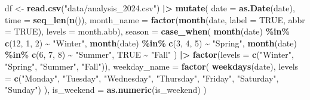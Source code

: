 \documentclass[
]{article}
\newenvironment{Shaded}{\begin{snugshade}}{\end{snugshade}}
\newcommand{\AttributeTok}[1]{\textcolor[rgb]{0.13,0.29,0.53}{#1}}
\newcommand{\ConstantTok}[1]{\textcolor[rgb]{0.56,0.35,0.01}{#1}}
\newcommand{\DecValTok}[1]{\textcolor[rgb]{0.00,0.00,0.81}{#1}}
\newcommand{\FunctionTok}[1]{\textcolor[rgb]{0.13,0.29,0.53}{\textbf{#1}}}
\newcommand{\NormalTok}[1]{#1}
\newcommand{\OtherTok}[1]{\textcolor[rgb]{0.56,0.35,0.01}{#1}}
\newcommand{\SpecialCharTok}[1]{\textcolor[rgb]{0.81,0.36,0.00}{\textbf{#1}}}
\newcommand{\StringTok}[1]{\textcolor[rgb]{0.31,0.60,0.02}{#1}}
\begin{document}
\begin{Shaded}
\begin{Highlighting}[]
\NormalTok{df }\OtherTok{\textless{}{-}} \FunctionTok{read.csv}\NormalTok{(}\StringTok{"data/analysis\_2024.csv"}\NormalTok{) }\SpecialCharTok{|\textgreater{}}
  \FunctionTok{mutate}\NormalTok{(}
    \AttributeTok{date =} \FunctionTok{as.Date}\NormalTok{(date),}
    \AttributeTok{time =} \FunctionTok{seq\_len}\NormalTok{(}\FunctionTok{n}\NormalTok{()),}
    \AttributeTok{month\_name =} \FunctionTok{factor}\NormalTok{(}\FunctionTok{month}\NormalTok{(date, }\AttributeTok{label =} \ConstantTok{TRUE}\NormalTok{, }\AttributeTok{abbr =} \ConstantTok{TRUE}\NormalTok{),}
                        \AttributeTok{levels =}\NormalTok{ month.abb),}
    \AttributeTok{season =} \FunctionTok{case\_when}\NormalTok{(}
      \FunctionTok{month}\NormalTok{(date) }\SpecialCharTok{\%in\%} \FunctionTok{c}\NormalTok{(}\DecValTok{12}\NormalTok{, }\DecValTok{1}\NormalTok{, }\DecValTok{2}\NormalTok{) }\SpecialCharTok{\textasciitilde{}} \StringTok{"Winter"}\NormalTok{,}
      \FunctionTok{month}\NormalTok{(date) }\SpecialCharTok{\%in\%} \FunctionTok{c}\NormalTok{(}\DecValTok{3}\NormalTok{, }\DecValTok{4}\NormalTok{, }\DecValTok{5}\NormalTok{)  }\SpecialCharTok{\textasciitilde{}} \StringTok{"Spring"}\NormalTok{,}
      \FunctionTok{month}\NormalTok{(date) }\SpecialCharTok{\%in\%} \FunctionTok{c}\NormalTok{(}\DecValTok{6}\NormalTok{, }\DecValTok{7}\NormalTok{, }\DecValTok{8}\NormalTok{)  }\SpecialCharTok{\textasciitilde{}} \StringTok{"Summer"}\NormalTok{,}
      \ConstantTok{TRUE}                         \SpecialCharTok{\textasciitilde{}} \StringTok{"Fall"}
\NormalTok{    ) }\SpecialCharTok{|\textgreater{}} \FunctionTok{factor}\NormalTok{(}\AttributeTok{levels =} \FunctionTok{c}\NormalTok{(}\StringTok{"Winter"}\NormalTok{, }\StringTok{"Spring"}\NormalTok{, }\StringTok{"Summer"}\NormalTok{, }\StringTok{"Fall"}\NormalTok{)),}
    \AttributeTok{weekday\_name =} \FunctionTok{factor}\NormalTok{(}
      \FunctionTok{weekdays}\NormalTok{(date),}
      \AttributeTok{levels =} \FunctionTok{c}\NormalTok{(}\StringTok{"Monday"}\NormalTok{, }\StringTok{"Tuesday"}\NormalTok{, }\StringTok{"Wednesday"}\NormalTok{,}
                 \StringTok{"Thursday"}\NormalTok{, }\StringTok{"Friday"}\NormalTok{, }\StringTok{"Saturday"}\NormalTok{, }\StringTok{"Sunday"}\NormalTok{)}
\NormalTok{    ),}
    \AttributeTok{is\_weekend =} \FunctionTok{as.numeric}\NormalTok{(is\_weekend)}
\NormalTok{  )}
\end{Highlighting}
\end{Shaded}
\end{document}
